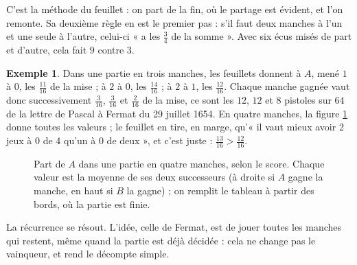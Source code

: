 \documentclass[11pt,a4paper]{article}
\theoremstyle{plain}
\theoremstyle{definition}
\newtheorem{exemple}[theoreme]{Exemple}
\theoremstyle{remark}
\begin{document}
C'est la méthode du feuillet : on part de la fin, où le partage est évident, et l'on remonte. Sa deuxième règle en est le premier pas : s'il faut deux manches à l'un et une seule à l'autre, celui-ci « a les $\frac34$ de la somme ». Avec six écus misés de part et d'autre, cela fait $9$ contre $3$.

\begin{exemple}\label{ex:table}
Dans une partie en trois manches, les feuillets donnent à $A$, mené $1$ à $0$, les $\frac{11}{16}$ de la mise ; à $2$ à $0$, les $\frac{14}{16}$ ; à $2$ à $1$, les $\frac{12}{16}$. Chaque manche gagnée vaut donc successivement $\frac3{16}$, $\frac3{16}$ et $\frac2{16}$ de la mise, ce sont les $12$, $12$ et $8$ pistoles sur $64$ de la lettre de Pascal à Fermat du 29 juillet 1654. En quatre manches, la figure \ref{fig:partis} donne toutes les valeurs ; le feuillet en tire, en marge, qu'« il vaut mieux avoir 2 jeux à 0 de 4 qu'un à 0 de deux », et c'est juste : $\frac{13}{16}>\frac{12}{16}$.
\end{exemple}

\begin{figure}[h]
\centering
{}
\caption{Part de $A$ dans une partie en quatre manches, selon le score. Chaque valeur est la moyenne de ses deux successeurs (à droite si $A$ gagne la manche, en haut si $B$ la gagne) ; on remplit le tableau à partir des bords, où la partie est finie.}\label{fig:partis}
\end{figure}

La récurrence se résout. L'idée, celle de Fermat, est de jouer toutes les manches qui restent, même quand la partie est déjà décidée : cela ne change pas le vainqueur, et rend le décompte simple.
\end{document}
